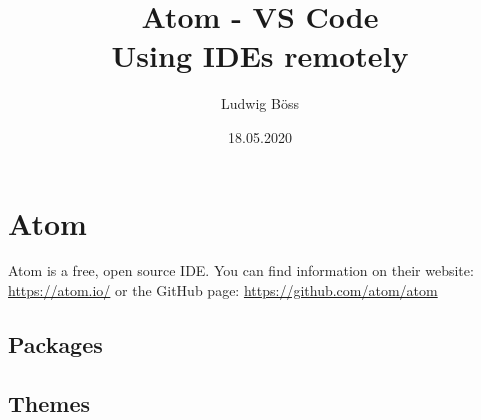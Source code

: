 \documentclass[10pt,a4paper]{article}
\title{Atom - VS Code\\Using IDEs remotely}
\date{18.05.2020}
\author{Ludwig Böss}
\begin{document}
\maketitle

\section{Atom}

Atom is a free, open source IDE. You can find information on their website: \url{https://atom.io/} or the GitHub page: \url{https://github.com/atom/atom}

\subsection{Packages}


\subsection{Themes}
\end{document}
